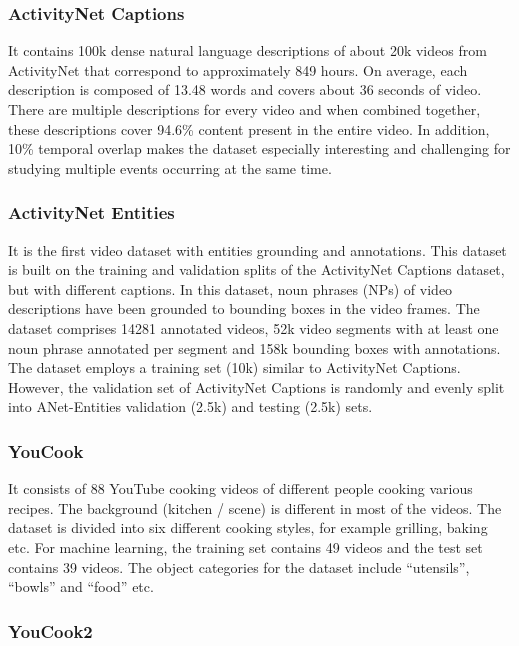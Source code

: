 \subsubsection{ActivityNet Captions}

\par It contains 100k dense natural language descriptions of about 20k videos from ActivityNet that correspond to approximately 849 hours. On average, each description is composed of 13.48 words and covers about 36 seconds of video. There are multiple descriptions for every video and when combined together, these descriptions cover 94.6\% content present in the entire video. In addition, 10\% temporal overlap makes the dataset especially interesting and challenging for studying multiple events occurring at the same time. 

\subsubsection{ActivityNet Entities}

\par It is the first video dataset with entities grounding and annotations. This dataset is built on the training and validation splits of the ActivityNet Captions dataset, but with different captions. In this dataset, noun phrases (NPs) of video descriptions have been grounded to bounding boxes in the video frames. The dataset comprises 14281 annotated videos, 52k video segments with at least one noun phrase annotated per segment and 158k bounding boxes with annotations. The dataset employs a training set (10k) similar to ActivityNet Captions. However, the validation set of ActivityNet Captions is randomly and evenly split into ANet-Entities validation (2.5k) and testing (2.5k) sets.

\subsubsection{YouCook}

\par It consists of 88 YouTube cooking videos of different people cooking various recipes. The background (kitchen / scene) is different in most of the videos. The dataset is divided into six different cooking styles, for example grilling, baking etc. For machine learning, the training set contains 49 videos and the test set contains 39 videos. The object categories for the dataset include “utensils”, “bowls” and “food” etc. 

\subsubsection{YouCook2}

